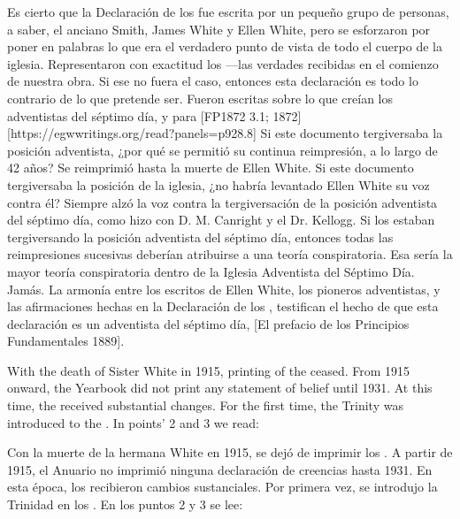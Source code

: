 Es cierto que la Declaración de los  fue escrita por un pequeño grupo de personas, a saber, el anciano Smith, James White y Ellen White, pero se esforzaron por poner en palabras lo que era el verdadero punto de vista de todo el cuerpo de la iglesia. Representaron con exactitud los —las verdades recibidas en el comienzo de nuestra obra. Si ese no fuera el caso, entonces esta declaración es todo lo contrario de lo que pretende ser. Fueron escritas  sobre lo que creían los adventistas del séptimo día,  y para [FP1872 3.1; 1872][https://egwwritings.org/read?panels=p928.8] Si este documento tergiversaba la posición adventista, ¿por qué se permitió su continua reimpresión, a lo largo de 42 años? Se reimprimió hasta la muerte de Ellen White. Si este documento tergiversaba la posición de la iglesia, ¿no habría levantado Ellen White su voz contra él? Siempre alzó la voz contra la tergiversación de la posición adventista del séptimo día, como hizo con D. M. Canright y el Dr. Kellogg. Si los  estaban tergiversando la posición adventista del séptimo día, entonces todas las reimpresiones sucesivas deberían atribuirse a una teoría conspiratoria. Esa sería la mayor teoría conspiratoria dentro de la Iglesia Adventista del Séptimo Día. Jamás. La armonía entre los escritos de Ellen White, los pioneros adventistas, y las afirmaciones hechas en la Declaración de los , testifican el hecho de que esta declaración es un  adventista del séptimo día, [El prefacio de los Principios Fundamentales 1889].


With the death of Sister White in 1915, printing of the  ceased. From 1915 onward, the Yearbook did not print any statement of belief until 1931. At this time, the  received substantial changes. For the first time, the Trinity was introduced to the . In points’ 2 and 3 we read:


Con la muerte de la hermana White en 1915, se dejó de imprimir los . A partir de 1915, el Anuario no imprimió ninguna declaración de creencias hasta 1931. En esta época, los  recibieron cambios sustanciales. Por primera vez, se introdujo la Trinidad en los . En los puntos 2 y 3 se lee:


